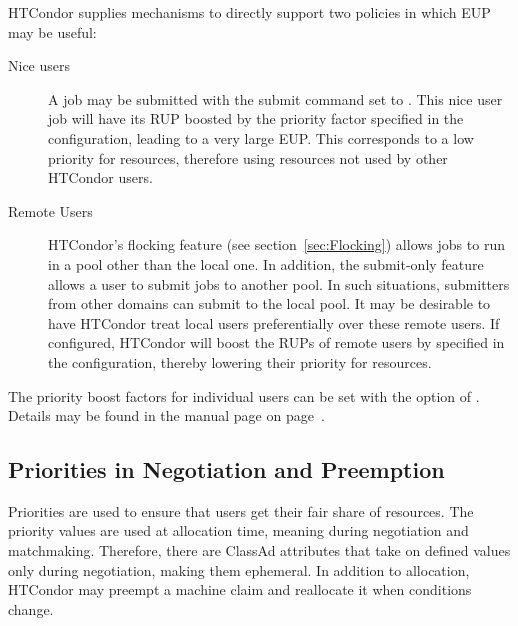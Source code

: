 HTCondor supplies mechanisms to directly support two policies in which EUP may
be useful:
\begin{description}
	\item[Nice users]  A job may be submitted with the submit command 
	 set to .
	This nice user job will have its RUP boosted by the 
	 priority factor specified in the 
	configuration, leading to a very large EUP.
	This corresponds to a low priority for resources,
	therefore using resources not used by other HTCondor users.

	\item[Remote Users] HTCondor's flocking feature (see
	section~\ref{sec:Flocking}) allows jobs to run in a pool
        other than the local one.
	In addition, the submit-only feature allows a user 
	to submit jobs to another pool.
	In such situations, submitters from other domains
	can submit to the local pool.
	It may be desirable to have HTCondor treat local users
	preferentially over these remote users.
	If configured, HTCondor will boost the RUPs of remote users by
	specified in the configuration,
	thereby lowering their priority for resources.
\end{description}

The priority boost factors for individual users can be set with the 
 option of .
Details may be found in the  manual page 
on page~\pageref{man-condor-userprio}.


\subsection{\label{sec:Priorities-in-Negotiation-and-Preemption}Priorities in Negotiation and Preemption}
Priorities are used to ensure that users get their fair share of resources.  
The priority values are used at allocation time, meaning during
negotiation and matchmaking.
Therefore, there are ClassAd attributes that take on defined values
only during negotiation, making them ephemeral.
In addition to allocation, HTCondor may preempt a machine claim 
and reallocate it when conditions change.


